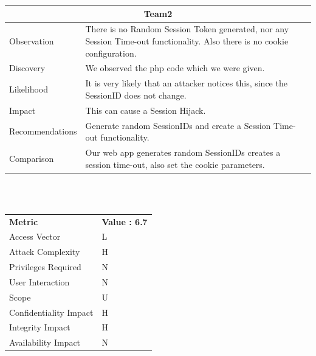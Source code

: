 \documentclass[headsepline,footsepline,footinclude=false,oneside,fontsize=11pt,paper=a4,listof=totoc,bibliography=totoc]{scrbook} %
\begin{document}
\begin{tabular}{ l|p{11cm}  }
	\hline
	\multicolumn{2}{c}{\textbf{Team2}} \\
	\hline
	Observation   & There is no Random Session Token generated, nor any Session Time-out functionality. Also there is no cookie configuration.\\
	Discovery  & We observed the php code which we were given.\\
	Likelihood & It is very likely that an attacker notices this, since the SessionID does not change.\\
	Impact    & This can cause a Session Hijack.\\
	Recommendations & Generate random SessionIDs and create a Session Time-out functionality.\\
	Comparison& Our web app generates random SessionIDs creates a session time-out, also set the cookie parameters. \\
	\hline
\end{tabular}
\\
\vspace{0.5cm}
\\
\begin{center}
	\begin{tabular}{ll}
		\rowcolor[HTML]{34CDF9}
		{\color[HTML]{ECF4FF} \textbf{Metric}}        & {\color[HTML]{ECF4FF} \textbf{Value : 6.7}} \\
		\rowcolor[HTML]{BBDAFF}
		{\color[HTML]{333333} Access Vector}          & {\color[HTML]{333333} } L              \\
		\rowcolor[HTML]{ECF4FF}
		{\color[HTML]{333333} Attack Complexity}      & {\color[HTML]{333333} } H              \\
		\rowcolor[HTML]{BBDAFF}
		{\color[HTML]{333333} Privileges Required}    & {\color[HTML]{333333} } N              \\
		\rowcolor[HTML]{ECF4FF}
		{\color[HTML]{333333} User Interaction}       & {\color[HTML]{333333} } N              \\
		\rowcolor[HTML]{BBDAFF}
		{\color[HTML]{333333} Scope}                  & {\color[HTML]{333333} } U 	              \\
		\rowcolor[HTML]{ECF4FF}
		{\color[HTML]{333333} Confidentiality Impact} & {\color[HTML]{333333} } H              \\
		\rowcolor[HTML]{BBDAFF}
		{\color[HTML]{333333} Integrity Impact}       & {\color[HTML]{333333} } H              \\
		\rowcolor[HTML]{ECF4FF}
		{\color[HTML]{333333} Availability Impact}    & {\color[HTML]{333333} } N
	\end{tabular}
\end{center}
\end{document}
